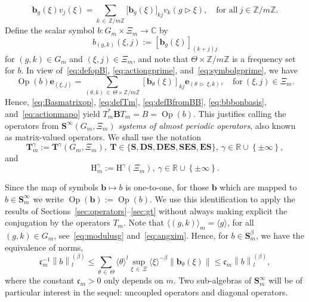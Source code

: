 \documentclass[10pt]{amsart}
\theoremstyle{definition}\newtheorem{defi}[theo]{Definition}\newtheorem{rema}[theo]{Remark}\newtheorem{exam}[theo]{Example}\newtheorem{nota}[theo]{Notation}
\DeclareMathOperator{\Op}{Op}
\renewcommand{\mathsf}{\mathrm}
\newcommand{\sfH}{\mathsf{H}}
\newcommand{\R}{\mathbb R}
\newcommand{\C}{\mathbb C}
\newcommand{\Z}{\mathbb Z}
\newcommand{\bb}{\mathbf b}
\newcommand{\BB}{\mathbf B}
\newcommand{\BD}{\mathbf D}
\newcommand{\BE}{\mathbf E}
\newcommand{\BS}{\mathbf S}
\newcommand{\BT}{\mathbf T}
\newcommand{\bbb}{\mathbf b}
\newcommand{\be}{\mathbf e}
\newcommand{\Fc}{\mathfrak c}
\newcommand{\act}{\triangleright}
\newcommand{\set}[1]{\left\{ #1 \right\}}
\newcommand{\norm}[1]{\left\| #1 \right\|}
\newcommand{\snorm}[3]{\left\| #1\right\|_{#3}^{(#2)}}
\newcommand{\ang}[1]{\langle #1 \rangle}
\begin{document}
\begin{equation}\label{eq:bbbonbasis}
\bbb_g(\xi)v_j(\xi)=\sum\limits_{k\,\in\,\Z/m\Z}\big[\bb_g(\xi)\big]_{kj}v_k(g\act\xi), \quad \text{for all} \ j\in \Z/m\Z.
\end{equation}
Define the scalar symbol $b:G_m\times\Xi_m\to\C$ by
\begin{equation}\label{eq:symbolgprime}
b_{(g,k)}(\xi,j):=\left[\bbb_g(\xi)\right]_{(k+j)j}
\end{equation}
for $(g,k)\in G_m$ and $(\xi,j)\in\Xi_m$, and note that $\Theta\times \Z/m\Z$ is a frequency set for $b$. In view of~\eqref{eq:defopB}, \eqref{eq:actiongprime}, and~\eqref{eq:symbolgprime}, we have
\begin{equation}\label{eq:actionmapo}
\Op(b) \be_{(\xi,j)} = \sum_{(\theta,k)\,\in\,\Theta \times \Z/m\Z} \left[\bbb_\theta(\xi)\right]_{kj} \be_{(\theta\,\act\,\xi,k)}, \quad \text{for} \ (\xi,j)\in\Xi_m.
\end{equation}
Hence, \eqref{eq:Basmatrixop}, \eqref{eq:defTm}, \eqref{eq:defBfromBB}, \eqref{eq:bbbonbasis}, and~\eqref{eq:actionmapo} yield $T_m^* \BB T_m = B = \Op(b)$. This justifies calling the operators from $\BS^\infty(G_m,\Xi_m)$ \emph{systems of almost periodic operators}, also known as matrix-valued operators. We shall use the notation
\begin{equation}\label{eq:defsystemclasses}
\BT_m^\gamma:=\BT^\gamma(G_m,\Xi_m),\ \BT\in\{\BS, \BD\BS, \BD\BE\BS, \BS\BE\BS, \BE\BS \}, \ \gamma\in\R\cup\set{\pm\infty},
\end{equation}
and
\begin{equation}
\sfH_m^\gamma:=\sfH^\gamma(\Xi_m),\ \gamma\in\R\cup\set{\pm\infty}.
\end{equation}

Since the map of symbols $\bbb\mapsto b$ is one-to-one, for those $\bbb$ which are mapped to $b\in\BS_m^\infty$ we write $\Op(\bbb):=\Op(b)$. We use this identification to apply the results of Sections~\ref{sec:operators}--\ref{sec:gt} without always making explicit the conjugation by the operators $T_m$. Note that $\ang{(g,k)}_m=\ang{g}$, for all $(g,k)\in G_m$, see~\eqref{eq:modulusg} and~\eqref{eq:angxim}. Hence, for $b\in\BS_m^\beta$, we have the equivalence of norms,
\begin{equation}\label{eq:matrixseminorm}
\Fc_m^{-1}\snorm{b}{\beta}{l}\leq\sum_{\theta\,\in\,\Theta} \ang \theta^l \sup_{\xi\,\in\,\Xi} \ang\xi^{-\beta}\norm{\bbb_{\theta}(\xi)}\leq \Fc_m\snorm{b}{\beta}{l},
\end{equation}
where the constant $\Fc_m>0$ only depends on $m$. Two sub-algebras of $\BS_m^\infty$ will be of particular interest in the sequel: uncoupled operators and diagonal operators.
\end{document}
